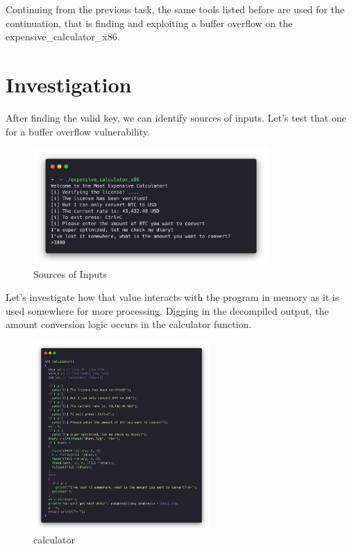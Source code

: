 Continuing from the previous task, the same tools listed before are used for the
continuation, that is finding and exploiting a buffer overflow on the
expensive\_calculator\_x86.

\section{Investigation}

After finding the valid key, we can identify sources of inputs. Let's test that
one for a buffer overflow vulnerability.

\begin{figure}[H]
  \centering
  \includegraphics[width=0.8\textwidth]{figures/source-input}
  \caption{Sources of Inputs}
  \label{f:source-input}
\end{figure}

Let's investigate how that value interacts with the program in memory as it is
used somewhere for more processing. Digging in the decompiled output, the amount
conversion logic occurs in the calculator function.

\begin{figure}[H]
  \centering
  \includegraphics[width=0.6\textwidth]{figures/calculator}
  \caption{calculator}
  \label{f:calculator}
\end{figure}

